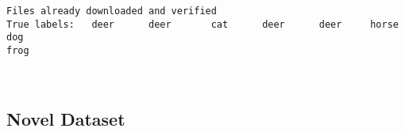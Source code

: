 \documentclass[11pt]{article}
\begin{document}
    \begin{Verbatim}[commandchars=\\\{\},fontsize=\footnotesize]
Files already downloaded and verified
True labels:   deer      deer       cat      deer      deer     horse       dog
frog

    \end{Verbatim}

    \begin{center}
    \end{center}
    { \hspace*{\fill} \\}
    
    \subsection{Novel Dataset}\label{novel-dataset}
\end{document}
